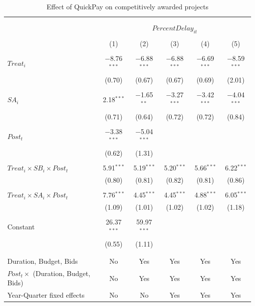 \documentclass[
]{article}
\begin{document}
\begin{table}[H] \centering 
  \caption{Effect of QuickPay on competitively awarded projects} 
  \label{} 
\small 
\begin{tabular}{@{\extracolsep{-2pt}}lccccc} 
\\[-1.8ex]\hline 
\hline \\[-1.8ex] 
\\[-1.8ex] & \multicolumn{5}{c}{$PercentDelay_{it}$  } \\ 
\\[-1.8ex] & (1) & (2) & (3) & (4) & (5)\\ 
\hline \\[-1.8ex] 
 $Treat_i$ & $-$8.76$^{***}$ & $-$6.88$^{***}$ & $-$6.88$^{***}$ & $-$6.69$^{***}$ & $-$8.59$^{***}$ \\ 
  & (0.70) & (0.67) & (0.67) & (0.69) & (2.01) \\ 
  & & & & & \\ 
 $SA_i$ & 2.18$^{***}$ & $-$1.65$^{**}$ & $-$3.27$^{***}$ & $-$3.42$^{***}$ & $-$4.04$^{***}$ \\ 
  & (0.71) & (0.64) & (0.72) & (0.72) & (0.84) \\ 
  & & & & & \\ 
 $Post_t$ & $-$3.38$^{***}$ & $-$5.04$^{***}$ &  &  &  \\ 
  & (0.62) & (1.31) &  &  &  \\ 
  & & & & & \\ 
 $Treat_i \times SB_i \times Post_t$ & 5.91$^{***}$ & 5.19$^{***}$ & 5.20$^{***}$ & 5.66$^{***}$ & 6.22$^{***}$ \\ 
  & (0.80) & (0.81) & (0.82) & (0.81) & (0.86) \\ 
  & & & & & \\ 
 $Treat_i \times SA_i \times Post_t$ & 7.76$^{***}$ & 4.45$^{***}$ & 4.45$^{***}$ & 4.88$^{***}$ & 6.05$^{***}$ \\ 
  & (1.09) & (1.01) & (1.02) & (1.02) & (1.18) \\ 
  & & & & & \\ 
 Constant & 26.37$^{***}$ & 59.97$^{***}$ &  &  &  \\ 
  & (0.55) & (1.11) &  &  &  \\ 
  & & & & & \\ 
\hline \\[-1.8ex] 
Duration, Budget, Bids & No & Yes & Yes & Yes & Yes \\ 
$Post_t \times $  (Duration, Budget, Bids) & No & Yes & Yes & Yes & Yes \\ 
Year-Quarter fixed effects & No & No & Yes & Yes & Yes \\ 

\end{tabular}
\end{table}
\end{document}
